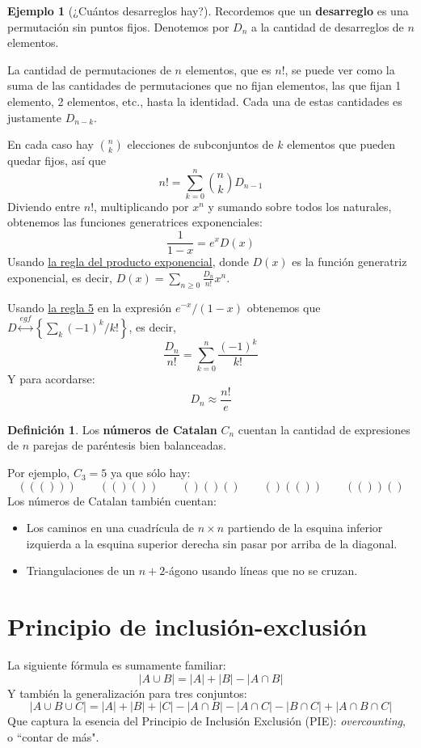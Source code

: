 \documentclass[spanish]{book}
\theoremstyle{definition}
\newtheorem*{defn}{Definición}
\newtheorem*{ejem}{Ejemplo}
\begin{document}
\begin{ejem}[¿Cuántos desarreglos hay?]
	Recordemos que un \textbf{desarreglo} es una permutación sin puntos fijos. Denotemos por $D_n$ a la cantidad de desarreglos de $n$ elementos.
	
	La cantidad de permutaciones de $n$ elementos, que es $n!$, se puede ver como la suma de las cantidades de permutaciones que no fijan elementos, las que fijan 1 elemento, 2 elementos, etc., hasta la identidad. Cada una de estas cantidades es justamente $D_{n-k}$.
	
	En cada caso hay ${n\choose k}$ elecciones de subconjuntos de $k$ elementos que pueden quedar fijos, así que
	\[n!=\sum_{k=0}^n{n\choose k}D_{n-1}\]
	Diviendo entre $n!$, multiplicando por $x^n$ y sumando sobre todos los naturales, obtenemos las funciones generatrices exponenciales:
	\[\frac{1}{1-x}=e^xD(x)\]
	Usando \hyperref[rule3p]{la regla del producto exponencial}, donde $D(x)$ es la función generatriz exponencial, es decir, $D(x)=\sum_{n\geq0}\frac{D_n}{n!}x^n$.
	
	Usando \hyperref[rule5]{la regla 5} en la expresión $e^{-x}/(1-x)$ obtenemos que $D\overset{egf}{\longleftrightarrow}\left\{\sum_k(-1)^k/k!\right\}$, es decir,
	\[\frac{D_n}{n!}=\sum_{k=0}^n\frac{(-1)^k}{k!}\]
	Y para acordarse:
	\[D_n\approx \frac{n!}{e}\]
\end{ejem}
\begin{defn}
	Los \textbf{números de Catalan} $C_n$ cuentan la cantidad de expresiones de $n$ parejas de paréntesis bien balanceadas.
\end{defn}
Por ejemplo, $C_3=5$ ya que sólo hay:
\[((()))\qquad(()())\qquad()()()\qquad()(())\qquad(())()\]
Los números de Catalan también cuentan:
\begin{itemize}
	\item Los caminos en una cuadrícula de $n\times n$ partiendo de la esquina inferior izquierda a la esquina superior derecha sin pasar por arriba de la diagonal.
	\item Triangulaciones de un $n+2$-ágono usando líneas que no se cruzan.
\end{itemize}

\chapter{Principio de inclusión-exclusión}
La siguiente fórmula es sumamente familiar:
\[|A\cup B|=|A|+|B|-|A\cap B|\]
Y también la generalización para tres conjuntos:
\[|A\cup B\cup C|=|A|+|B|+|C|-|A\cap B|-|A\cap C|-|B\cap C|+|A\cap B\cap C|\]
Que captura la esencia del Principio de Inclusión Exclusión (PIE): \textit{overcounting}, o ``contar de más".
\end{document}
